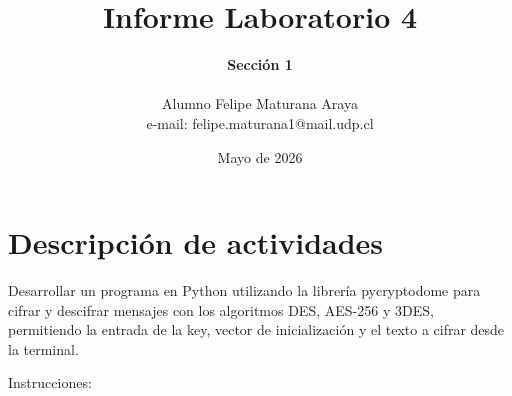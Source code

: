\documentclass[letter,12pt]{article}
\begin{document}
%
   \title{\Huge{Informe Laboratorio 4}}

   \author{\textbf{Sección 1} \\  \\Alumno Felipe Maturana Araya \\ e-mail: felipe.maturana1@mail.udp.cl}
          
   \date{Mayo de 2026}

   \maketitle
   
   \tableofcontents
 
  \newpage
  

\section{Descripción de actividades}
Desarrollar un programa en Python utilizando la librería pycryptodome para cifrar y descifrar mensajes con los algoritmos DES, AES-256 y 3DES, permitiendo la entrada de la key, vector de inicialización y el texto a cifrar desde la terminal. 

Instrucciones:
\end{document}

